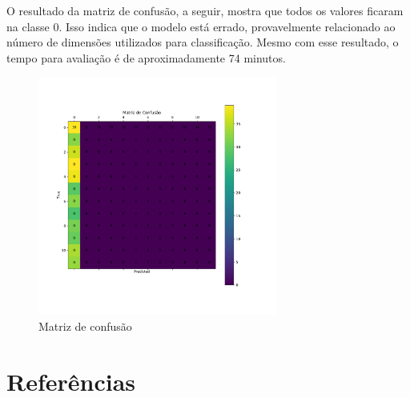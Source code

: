 \documentclass[12pt,
	english,			%
	french,				%
	spanish,			%
	brazil,				%
	]{article}
\begin{document}
O resultado da matriz de confusão, a seguir, mostra que todos os valores ficaram na classe 0. Isso indica que o modelo está errado, provavelmente relacionado ao número de dimensões utilizados para classificação. Mesmo com esse resultado, o tempo para avaliação é de aproximadamente 74 minutos.

\begin{figure}[!htb]
\centering
\includegraphics[width=0.7\textwidth]{images/cm_svm_rbf.pdf}
\caption{\label{fig:cm_svm_rfb}Matriz de confusão}
\end{figure}

\clearpage

\section{Referências}



\end{document}
